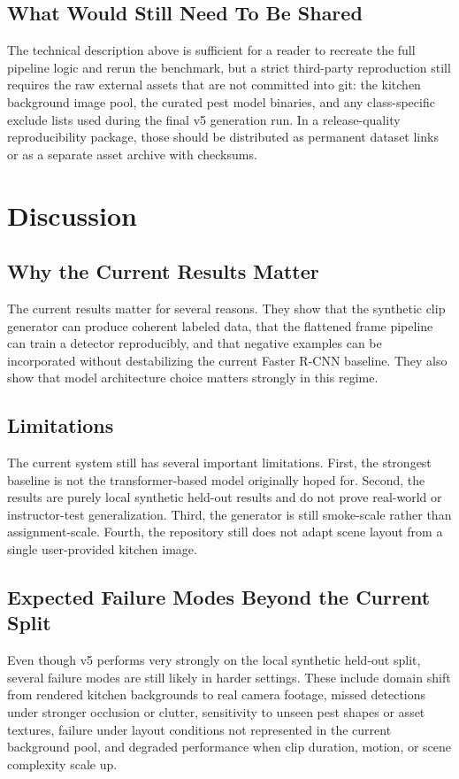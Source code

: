\documentclass[11pt]{article}
\begin{document}
\subsection{What Would Still Need To Be Shared}
The technical description above is sufficient for a reader to recreate the full pipeline logic and rerun the benchmark, but a strict third-party reproduction still requires the raw external assets that are not committed into git: the kitchen background image pool, the curated pest model binaries, and any class-specific exclude lists used during the final v5 generation run. In a release-quality reproducibility package, those should be distributed as permanent dataset links or as a separate asset archive with checksums.



\section{Discussion}
\subsection{Why the Current Results Matter}
The current results matter for several reasons. They show that the synthetic clip generator can produce coherent labeled data, that the flattened frame pipeline can train a detector reproducibly, and that negative examples can be incorporated without destabilizing the current Faster R-CNN baseline. They also show that model architecture choice matters strongly in this regime.

\subsection{Limitations}
The current system still has several important limitations. First, the strongest baseline is not the transformer-based model originally hoped for. Second, the results are purely local synthetic held-out results and do not prove real-world or instructor-test generalization. Third, the generator is still smoke-scale rather than assignment-scale. Fourth, the repository still does not adapt scene layout from a single user-provided kitchen image.

\subsection{Expected Failure Modes Beyond the Current Split}
Even though v5 performs very strongly on the local synthetic held-out split, several failure modes are still likely in harder settings. These include domain shift from rendered kitchen backgrounds to real camera footage, missed detections under stronger occlusion or clutter, sensitivity to unseen pest shapes or asset textures, failure under layout conditions not represented in the current background pool, and degraded performance when clip duration, motion, or scene complexity scale up.
\end{document}

